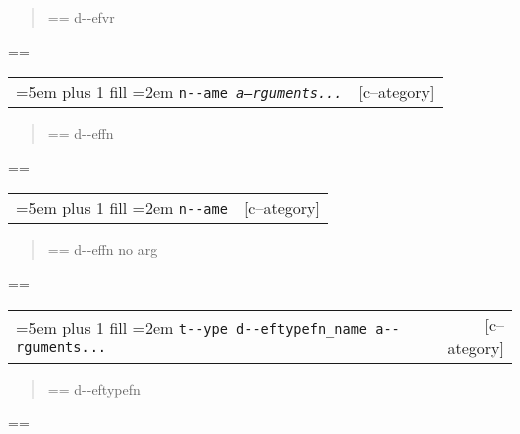 \documentclass{book}
\makeatletter
\newenvironment{GNUTexinfopreformatted}{%
  \par\GNUTobeylines\obeyspaces\frenchspacing
  \parskip=\z@\parindent=\z@}{}
{\catcode`\^^M=13 \gdef\GNUTobeylines{\catcode`\^^M=13 \def^^M{\null\par}}}
\newenvironment{GNUTexinfoindented}
  {\begin{list}{}{}
  \item\relax}
  {\end{list}}
\makeatother
\begin{document}
\begin{GNUTexinfoindented}
%
\begin{quote}
\unskip{\parskip=0pt\noindent}%
\begin{GNUTexinfopreformatted}%
\ttfamily d{-}{-}efvr
\end{GNUTexinfopreformatted}
\end{quote}
\begin{GNUTexinfopreformatted}%
\ttfamily 
\end{GNUTexinfopreformatted}

\noindent\begin{tabularx}{\linewidth}{@{}Xr}
\rightskip=5em plus 1 fill
\hangindent=2em
\texttt{n{-}{-}ame \EmbracOn{}\textnormal{\textsl{a--rguments...}}\EmbracOff{}}& [c--ategory]
\end{tabularx}

%
\begin{quote}
\unskip{\parskip=0pt\noindent}%
\begin{GNUTexinfopreformatted}%
\ttfamily d{-}{-}effn
\end{GNUTexinfopreformatted}
\end{quote}
\begin{GNUTexinfopreformatted}%
\ttfamily 
\end{GNUTexinfopreformatted}

\noindent\begin{tabularx}{\linewidth}{@{}Xr}
\rightskip=5em plus 1 fill
\hangindent=2em
\texttt{n{-}{-}ame}& [c--ategory]
\end{tabularx}

%
\begin{quote}
\unskip{\parskip=0pt\noindent}%
\begin{GNUTexinfopreformatted}%
\ttfamily d{-}{-}effn no arg
\end{GNUTexinfopreformatted}
\end{quote}
\begin{GNUTexinfopreformatted}%
\ttfamily 
\end{GNUTexinfopreformatted}

\noindent\begin{tabularx}{\linewidth}{@{}Xr}
\rightskip=5em plus 1 fill
\hangindent=2em
\texttt{t{-}{-}ype d{-}{-}eftypefn\_name a{-}{-}rguments...}& [c--ategory]
\end{tabularx}

%
\begin{quote}
\unskip{\parskip=0pt\noindent}%
\begin{GNUTexinfopreformatted}%
\ttfamily d{-}{-}eftypefn
\end{GNUTexinfopreformatted}
\end{quote}
\begin{GNUTexinfopreformatted}%
\ttfamily 
\end{GNUTexinfopreformatted}


\end{GNUTexinfoindented}
\end{document}
